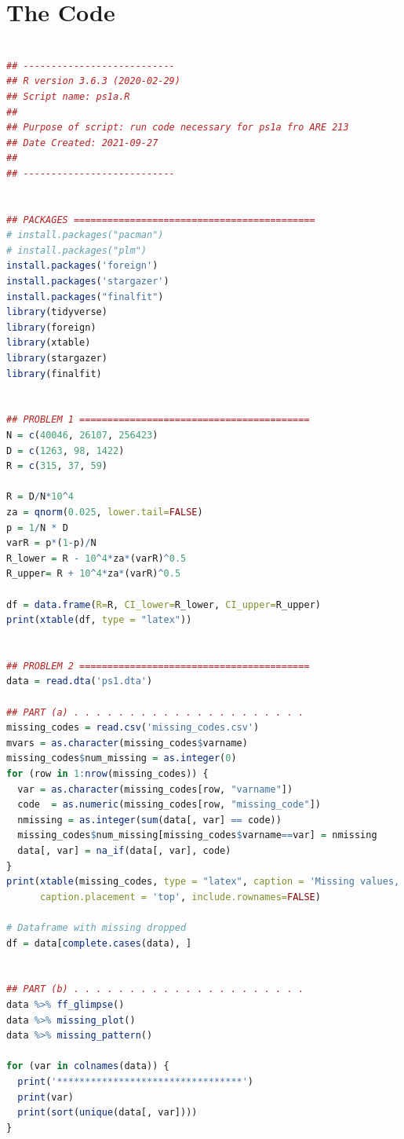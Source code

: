 \documentclass[12pt]{article}
\begin{document}
\section*{The Code}
\begin{lstlisting}[language=R]

## ---------------------------
## R version 3.6.3 (2020-02-29)
## Script name: ps1a.R
##
## Purpose of script: run code necessary for ps1a fro ARE 213
## Date Created: 2021-09-27
##
## ---------------------------


## PACKAGES ===========================================
# install.packages("pacman")
# install.packages("plm")
install.packages('foreign')
install.packages('stargazer')
install.packages("finalfit")
library(tidyverse)
library(foreign)
library(xtable)
library(stargazer)
library(finalfit) 


## PROBLEM 1 =========================================
N = c(40046, 26107, 256423)
D = c(1263, 98, 1422)
R = c(315, 37, 59)

R = D/N*10^4
za = qnorm(0.025, lower.tail=FALSE)
p = 1/N * D
varR = p*(1-p)/N
R_lower = R - 10^4*za*(varR)^0.5
R_upper= R + 10^4*za*(varR)^0.5

df = data.frame(R=R, CI_lower=R_lower, CI_upper=R_upper)
print(xtable(df, type = "latex"))


## PROBLEM 2 =========================================
data = read.dta('ps1.dta')

## PART (a) . . . . . . . . . . . . . . . . . . . . . 
missing_codes = read.csv('missing_codes.csv')
mvars = as.character(missing_codes$varname)
missing_codes$num_missing = as.integer(0)
for (row in 1:nrow(missing_codes)) {
  var = as.character(missing_codes[row, "varname"])
  code  = as.numeric(missing_codes[row, "missing_code"])
  nmissing = as.integer(sum(data[, var] == code))
  missing_codes$num_missing[missing_codes$varname==var] = nmissing
  data[, var] = na_if(data[, var], code)
}
print(xtable(missing_codes, type = "latex", caption = 'Missing values, by variable name.'), 
      caption.placement = 'top', include.rownames=FALSE)

# Dataframe with missing dropped
df = data[complete.cases(data), ]


## PART (b) . . . . . . . . . . . . . . . . . . . . . 
data %>% ff_glimpse()
data %>% missing_plot()
data %>% missing_pattern()

for (var in colnames(data)) {
  print('*********************************')
  print(var)
  print(sort(unique(data[, var])))
}


\end{lstlisting}
\end{document}
